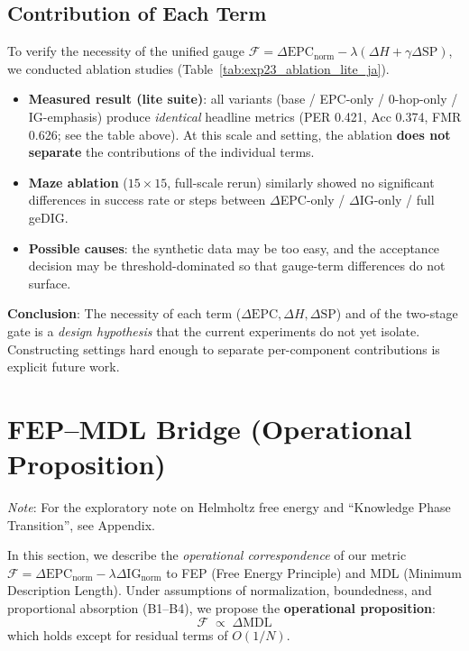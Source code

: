 \documentclass[12pt]{article}
\newcommand{\F}{\mathcal{F}}
\newcommand{\gednorm}{\Delta\mathrm{EPC}_{\mathrm{norm}}}
\newcommand{\ignorm}{\Delta\mathrm{IG}_{\mathrm{norm}}}
\begin{document}
\subsection{Contribution of Each Term}
To verify the necessity of the unified gauge $\F = \gednorm - \lambda(\Delta H + \gamma \Delta \mathrm{SP})$, we conducted ablation studies (Table~\ref{tab:exp23_ablation_lite_ja}).

\begin{table}[H]
  \centering
  \caption{Ablation summary (equal resources).}
  \label{tab:exp23_ablation_lite_ja}
  
\end{table}

\begin{itemize}
    \item \textbf{Measured result (lite suite)}: all variants (base / EPC-only / 0-hop-only / IG-emphasis) produce \emph{identical} headline metrics (PER 0.421, Acc 0.374, FMR 0.626; see the table above). At this scale and setting, the ablation \textbf{does not separate} the contributions of the individual terms.
    \item \textbf{Maze ablation} ($15{\times}15$, full-scale rerun) similarly showed no significant differences in success rate or steps between $\Delta$EPC-only / $\Delta$IG-only / full geDIG.
    \item \textbf{Possible causes}: the synthetic data may be too easy, and the acceptance decision may be threshold-dominated so that gauge-term differences do not surface.
\end{itemize}

\textbf{Conclusion}: The necessity of each term ($\Delta\mathrm{EPC}, \Delta H, \Delta\mathrm{SP}$) and of the two-stage gate is a \emph{design hypothesis} that the current experiments do not yet isolate. Constructing settings hard enough to separate per-component contributions is explicit future work.

\section{FEP--MDL Bridge (Operational Proposition)}
\label{sec:fep_mdl_bridge}
\label{sec:dual_fep_mdl}

\noindent\textit{Note}: For the exploratory note on Helmholtz free energy and ``Knowledge Phase Transition'', see Appendix.

In this section, we describe the \emph{operational correspondence} of our metric $\F=\gednorm-\lambda\ignorm$ to FEP (Free Energy Principle) and MDL (Minimum Description Length). Under assumptions of normalization, boundedness, and proportional absorption (B1--B4), we propose the \textbf{operational proposition}:
\[
    \F \;\propto\; \Delta\mathrm{MDL}
\]
which holds except for residual terms of $O(1/N)$.
\end{document}

